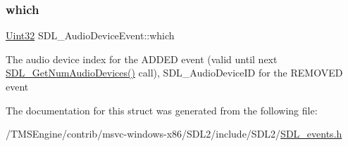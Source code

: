 \subsubsection{\texorpdfstring{which}{which}}
{\footnotesize\ttfamily \hyperlink{_s_d_l__stdinc_8h_add440eff171ea5f55cb00c4a9ab8672d}{Uint32} S\+D\+L\+\_\+\+Audio\+Device\+Event\+::which}

The audio device index for the A\+D\+D\+ED event (valid until next \hyperlink{_s_d_l__audio_8h_ae165f64b3f0fecfebe1c97731600ca59}{S\+D\+L\+\_\+\+Get\+Num\+Audio\+Devices()} call), S\+D\+L\+\_\+\+Audio\+Device\+ID for the R\+E\+M\+O\+V\+ED event 

The documentation for this struct was generated from the following file\+:\begin{DoxyCompactItemize}
\item 
/\+T\+M\+S\+Engine/contrib/msvc-\/windows-\/x86/\+S\+D\+L2/include/\+S\+D\+L2/\hyperlink{_s_d_l__events_8h}{S\+D\+L\+\_\+events.\+h}\end{DoxyCompactItemize}
